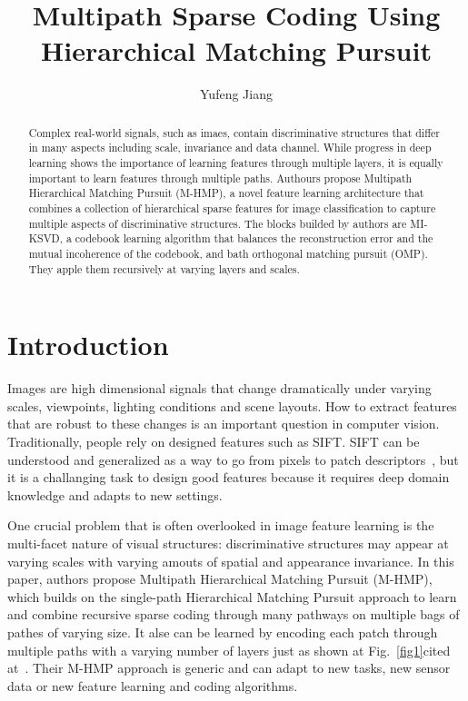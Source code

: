 \documentclass[10pt,twocolumn,letterpaper]{article}
\begin{document}
\title{Multipath Sparse Coding Using Hierarchical Matching Pursuit}
\author{Yufeng Jiang}
\maketitle

\begin{abstract}

Complex real-world signals, such as imaes, contain discriminative structures that differ in many aspects including scale, invariance and data channel. While progress in deep learning shows the importance of learning features through multiple layers, it is equally important to learn features through multiple paths. Authours propose Multipath Hierarchical Matching Pursuit (M-HMP), a novel feature learning architecture that combines a collection of hierarchical sparse features for image classification to capture multiple aspects of discriminative structures. The blocks builded by authors are MI-KSVD, a codebook learning algorithm that balances the reconstruction error and the mutual incoherence of the codebook, and bath orthogonal matching pursuit (OMP). They apple them recursively at varying layers and scales.

\end{abstract}

\section{Introduction}

Images are high dimensional signals that change dramatically under varying scales, viewpoints, lighting conditions and scene layouts. How to extract features that are robust to these changes is an important question in computer vision. Traditionally, people rely on designed features such as SIFT. SIFT can be understood and generalized as a way to go from pixels to patch descriptors~\cite{Kernel}, but it is a challanging task to design good features because it requires deep domain knowledge and adapts to new settings.

One crucial problem that is often overlooked in image feature learning is the multi-facet nature of visual structures: discriminative structures may appear at varying scales with varying amouts of spatial and appearance invariance. In this paper, authors propose Multipath Hierarchical Matching Pursuit (M-HMP), which builds on the single-path Hierarchical Matching Pursuit approach to learn and combine recursive sparse coding through many pathways on multiple bags of pathes of varying size. It alse can be learned by encoding each patch through multiple paths with a varying number of layers just as shown at Fig.~\ref{fig1}cited at~\cite{multipath}. Their M-HMP approach is generic and can adapt to new tasks, new sensor data or new feature learning and coding algorithms. 
\end{document}
